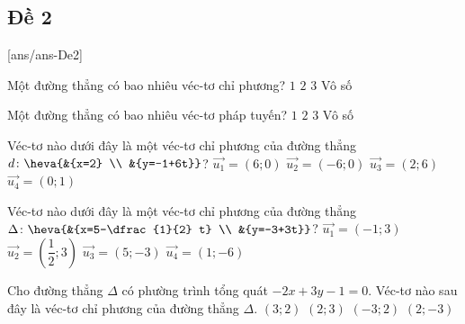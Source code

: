 \subsection{Đề 2}
[ans/ans-De2]
\caulc
\begin{ex}%
	Một đường thẳng có bao nhiêu véc-tơ chỉ phương?
	\choice
	{$1$}
	{$2$}
	{$3$}
	{\True Vô số}
	\loigiai{}
\end{ex}
\begin{ex}%
	Một đường thẳng có bao nhiêu véc-tơ pháp tuyến?
	\choice
	{$1$}
	{$2$}
	{$3$}
	{\True Vô số}
	\loigiai{
	}
\end{ex}
\begin{ex}%
	Véc-tơ nào dưới đây là một véc-tơ chỉ phương của đường thẳng $d\colon \heva{&{x=2} \\	&{y=-1+6t}}$?
	\choice
	{$\overrightarrow{u_1}=\left(6;0\right)$}
	{$\overrightarrow{u_2}=\left(-6;0\right)$}
	{$\overrightarrow{u_3}=\left(2;6\right)$}
	{\True $\overrightarrow{u_4}=\left(0;1\right)$}
\end{ex}
\begin{ex}%
	Véc-tơ nào dưới đây là một véc-tơ chỉ phương của đường thẳng $\Delta\colon \heva{&{x=5-\dfrac{1}{2} t} \\	&{y=-3+3t}}$?
	\choice
	{$\overrightarrow{u_1}=\left(-1;3\right)$}
	{$\overrightarrow{u_2}=\left(\dfrac{1}{2};3\right)$}
	{$\overrightarrow{u_3}=\left(5;-3\right)$}
	{\True $\overrightarrow{u_4}=\left(1;-6\right)$}
\end{ex}
\begin{ex}%
	Cho đường thẳng $\Delta$ có phường trình tổng quát $-2x+3y-1=0$.
	Véc-tơ nào sau đây là véc-tơ chỉ phương của đường thẳng $\Delta$.
	\choice
	{\True $(3; 2)$}
	{$(2; 3)$}
	{$(-3; 2)$}
	{$(2;-3)$}
\end{ex}
